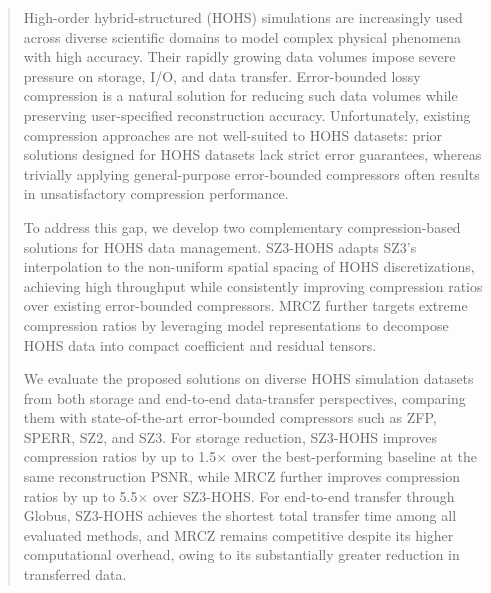 \begin{abstract}

High-order hybrid-structured (HOHS) simulations are increasingly used across diverse scientific domains to model complex physical phenomena with high accuracy. Their rapidly growing data volumes impose severe pressure on storage, I/O, and data transfer. Error-bounded lossy compression is a natural solution for reducing such data volumes while preserving user-specified reconstruction accuracy. Unfortunately, existing compression approaches are not well-suited to HOHS datasets: prior solutions designed for HOHS datasets lack strict error guarantees, whereas trivially applying general-purpose error-bounded compressors often results in unsatisfactory compression performance.

To address this gap, we develop two complementary compression-based solutions for HOHS data management. SZ3-HOHS adapts SZ3’s interpolation to the non-uniform spatial spacing of HOHS discretizations, achieving high throughput while consistently improving compression ratios over existing error-bounded compressors. MRCZ further targets extreme compression ratios by leveraging model representations to decompose HOHS data into compact coefficient and residual tensors.

We evaluate the proposed solutions on diverse HOHS simulation datasets from both storage and end-to-end data-transfer perspectives, comparing them with state-of-the-art error-bounded compressors such as ZFP, SPERR, SZ2, and SZ3. For storage reduction, SZ3-HOHS improves compression ratios by up to 1.5× over the best-performing baseline at the same reconstruction PSNR, while MRCZ further improves compression ratios by up to 5.5× over SZ3-HOHS. For end-to-end transfer through Globus, SZ3-HOHS achieves the shortest total transfer time among all evaluated methods, and MRCZ remains competitive despite its higher computational overhead, owing to its substantially greater reduction in transferred data.

\end{abstract}